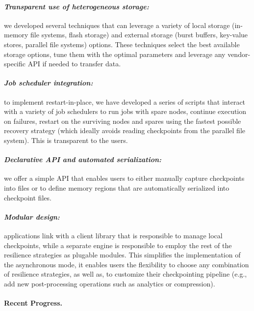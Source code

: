 \paragraph{\emph{Transparent use of heterogeneous storage:}} we
developed several techniques that can leverage a variety of local
storage (in-memory file systems, flash storage) and external storage
(burst buffers, key-value stores, parallel file systems)
options. These techniques select the best available storage options,
tune them with the optimal parameters and leverage any vendor-specific
API if needed to transfer data.
\vspace{-1em}

\paragraph{\emph{Job scheduler integration:}} to implement
restart-in-place, we have developed a series of scripts that interact
with a variety of job schedulers to run jobs with spare nodes,
continue execution on failures, restart on the surviving nodes and
spares using the fastest possible recovery strategy (which ideally
avoids reading checkpoints from the parallel file system). This is
transparent to the users.
\vspace{-1em}

\paragraph{\emph{Declarative API and automated serialization:}} we
offer a simple API that enables users to either manually capture
checkpoints into files or to define memory regions that are
automatically serialized into checkpoint files.
\vspace{-1em}

\paragraph{\emph{Modular design:}} applications link with a client
library that is responsible to manage local checkpoints, while a
separate engine is responsible to employ the rest of the resilience
strategies as plugable modules. This simplifies the implementation
of the asynchronous mode, it enables users the flexibility to choose any
combination of resilience strategies, as well as, to customize their
checkpointing pipeline (e.g., add new post-processing operations such
as analytics or compression).

\paragraph{Recent Progress.}

